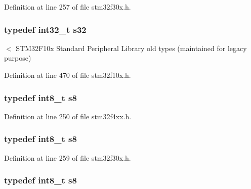 Definition at line 257 of file stm32f30x.\-h.

\hypertarget{group___exported__types_gae9b1af5c037e57a98884758875d3a7c4}{
\subsubsection[{s32}]{\setlength{\rightskip}{0pt plus 5cm}typedef {\bf int32\-\_\-t} {\bf s32}}}\label{group___exported__types_gae9b1af5c037e57a98884758875d3a7c4}
$<$ S\-T\-M32\-F10x Standard Peripheral Library old types (maintained for legacy purpose) 

Definition at line 470 of file stm32f10x.\-h.

\hypertarget{group___exported__types_ga9e382f207c65ca13ab4ae98363aeda80}{
\subsubsection[{s8}]{\setlength{\rightskip}{0pt plus 5cm}typedef {\bf int8\-\_\-t} {\bf s8}}}\label{group___exported__types_ga9e382f207c65ca13ab4ae98363aeda80}


Definition at line 250 of file stm32f4xx.\-h.

\hypertarget{group___exported__types_ga9e382f207c65ca13ab4ae98363aeda80}{
\subsubsection[{s8}]{\setlength{\rightskip}{0pt plus 5cm}typedef {\bf int8\-\_\-t} {\bf s8}}}\label{group___exported__types_ga9e382f207c65ca13ab4ae98363aeda80}


Definition at line 259 of file stm32f30x.\-h.

\hypertarget{group___exported__types_ga9e382f207c65ca13ab4ae98363aeda80}{
\subsubsection[{s8}]{\setlength{\rightskip}{0pt plus 5cm}typedef {\bf int8\-\_\-t} {\bf s8}}}\label{group___exported__types_ga9e382f207c65ca13ab4ae98363aeda80}



